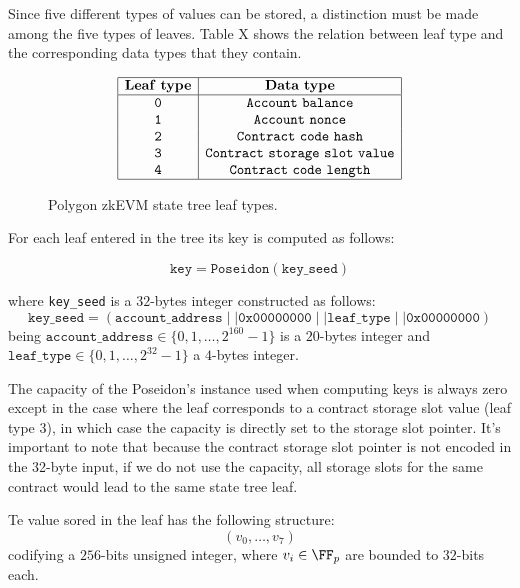 Since five different types of values can be stored, a distinction must be made among the five types of leaves. Table X shows the relation between leaf type and the corresponding data types that they contain.

\begin{figure}[h!]
    \renewcommand{\figurename}{Table}
    \[
    \begin{array}{|c|c|}
        \hline
        \mathbf{Leaf~type} &\mathbf{Data~type} \\ \hline
        \mathtt{0} & \mathtt{Account~balance} \\
        \mathtt{1} & \mathtt{Account~nonce} \\
        \mathtt{2} & \mathtt{Contract~code~hash} \\
        \mathtt{3} & \mathtt{Contract~storage~slot~value} \\
        \mathtt{4} & \mathtt{Contract~code~length} \\
        \hline
    \end{array}
    \]
    \caption{Polygon zkEVM state tree leaf types.}
    \label{tab:memory-first-example}
\end{figure}


For each leaf entered in the tree its key is computed as follows:

$$\texttt{key} = \texttt{Poseidon}(\texttt{key\_seed})$$

where \texttt{key\_seed} is a $32$-bytes integer constructed as follows:
\[
\texttt{key\_seed} = (\texttt{account\_address} \mid\mid \texttt{0x00000000} \mid\mid \texttt{leaf\_type} \mid\mid \texttt{0x00000000})
\]
being $\texttt{account\_address} \in \{0, 1, \dots, 2^{160} - 1\}$ is a $20$-bytes integer and $\texttt{leaf\_type} \in \{0, 1, \dots, 2^{32} - 1\}$ a $4$-bytes integer.

The capacity of the Poseidon's instance used when computing keys is always zero except in the case where the leaf corresponds to a contract storage slot value (leaf type 3), in which case the capacity is directly set to the storage slot pointer. It's important to note that because the contract storage slot pointer is not encoded in the 32-byte input, if we do not use the capacity, all storage slots for the same contract would lead to the same state tree leaf.

Te value sored in the leaf has the following structure:
\[
(v_0, \dots, v_7)
\]
codifying a $256$-bits unsigned integer, where $v_i \in \FF_p$ are bounded to $32$-bits each. 

